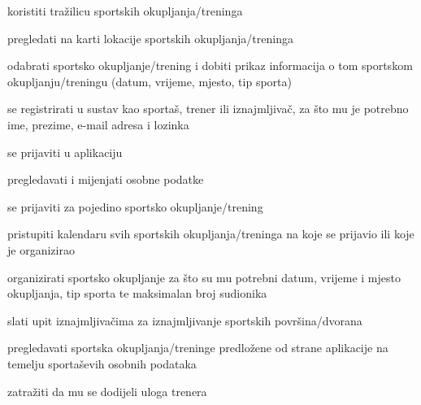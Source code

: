			
			\begin{packed_enum}
				
				\item  {}
				
				\begin{packed_enum}
					
					\item koristiti tražilicu sportskih okupljanja/treninga
					\item pregledati na karti lokacije sportskih okupljanja/treninga
					\item odabrati sportsko okupljanje/trening i dobiti prikaz informacija o tom sportskom okupljanju/treningu (datum, vrijeme, mjesto, tip sporta)
					\item se registrirati u sustav kao sportaš, trener ili iznajmljivač, za što mu je potrebno ime, prezime, e-mail adresa i lozinka
					
				\end{packed_enum}
				
				
				\item  {}
				
				\begin{packed_enum}
					
					\item se prijaviti u aplikaciju
					\item pregledavati i mijenjati osobne podatke
					\item se prijaviti za pojedino sportsko okupljanje/trening
					\item pristupiti kalendaru svih sportskih okupljanja/treninga na koje se prijavio ili koje je organizirao
					\item organizirati sportsko okupljanje za što su mu potrebni datum, vrijeme i mjesto okupljanja, tip sporta te maksimalan broj sudionika
					\item slati upit iznajmljivačima za iznajmljivanje sportskih površina/dvorana
					\item pregledavati sportska okupljanja/treninge predložene od strane aplikacije na temelju sportaševih osobnih podataka
					\item zatražiti da mu se dodijeli uloga trenera
					
				\end{packed_enum}
			
				\item  {}
				

\end{packed_enum}
